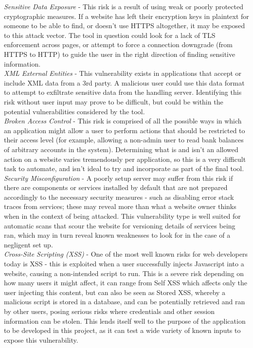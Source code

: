 	\emph{Sensitive Data Exposure} - This risk is a result of using weak or poorly protected cryptographic measures. If a website has left their encryption keys in plaintext for someone to be able to find, or doesn't use HTTPS altogether, it may be exposed to this attack vector. The tool in question could look for a lack of TLS enforcement across pages, or attempt to force a connection downgrade (from HTTPS to HTTP) to guide the user in the right direction of finding sensitive information. \\
	
	\emph{XML External Entities} - This vulnerability exists in applications that accept or include XML data from a 3rd party. A malicious user could use this data format to attempt to exfiltrate sensitive data from the handling server. Identifying this risk without user input may prove to be difficult, but could be within the potential vulnerabilities considered by the tool. \\
	
	\emph{Broken Access Control} - This risk is comprised of all the possible ways in which an application might allow a user to perform actions that should be restricted to their access level (for example, allowing a non-admin user to read bank balances of arbitrary accounts in the system). Determining what is and isn't an allowed action on a website varies tremendously per application, so this is a very difficult task to automate, and isn't ideal to try and incorporate as part of the final tool.   \\
	
	\emph{Security Misconfiguration} - A poorly setup server may suffer from this risk if there are components or services installed by default that are not prepared accordingly to the necessary security measures - such as disabling error stack traces from services; these may reveal more than what a website owner thinks when in the context of being attacked. This vulnerability type is well suited for automatic scans that scour the website for versioning details of services being ran, which may in turn reveal known weaknesses to look for in the case of a negligent set up.\\
	
	\emph{Cross-Site Scripting (XSS)} - One of the most well known risks for web developers today is XSS - this is exploited when a user successfully injects Javascript into a website, causing a non-intended script to run. This is a severe risk depending on how many users it might affect, it can range from Self XSS which affects only the user injecting this content, but can also be seen as Stored XSS, whereby a malicious script is stored in a database, and can be potentially retrieved and ran by other users, posing serious risks where credentials and other session information can be stolen. This lends itself well to the purpose of the application to be developed in this project, as it can test a wide variety of known inputs to expose this vulnerability. \\
	
